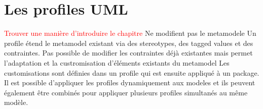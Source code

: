 \chapter{Les profiles UML}

\label{profils-UML.sect}

\textcolor{red}{Trouver une manière d'introduire le chapitre}
Ne modifient pas le metamodele
Un profile étend le metamodel existant via des stereotypes, des tagged values et des contraintes.
Pas possible de modifier les contraintes déjà existantes mais permet l'adaptation et la custromisation d'éléments existants du metamodel
Les customisations sont définies dans un profile qui est ensuite appliqué à un package.
Il est possible d'appliquer les profiles dynamiquement aux modeles et ils peuvent également être combinés pour appliquer plusieurs profiles simultanés au même modèle.

